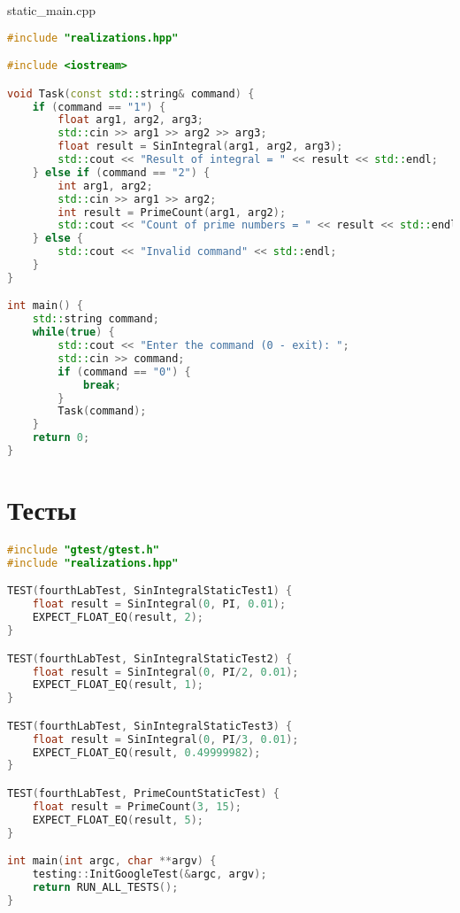 \documentclass[a4paper, 12pt]{article}
\begin{document}
static\_main.cpp
\begin{lstlisting}[language=C++]
#include "realizations.hpp"

#include <iostream>

void Task(const std::string& command) {
    if (command == "1") {
        float arg1, arg2, arg3;
        std::cin >> arg1 >> arg2 >> arg3;
        float result = SinIntegral(arg1, arg2, arg3);
        std::cout << "Result of integral = " << result << std::endl;
    } else if (command == "2") {
        int arg1, arg2;
        std::cin >> arg1 >> arg2;
        int result = PrimeCount(arg1, arg2);
        std::cout << "Count of prime numbers = " << result << std::endl;
    } else {
        std::cout << "Invalid command" << std::endl;
    }
}

int main() {
    std::string command;
    while(true) {
        std::cout << "Enter the command (0 - exit): ";
        std::cin >> command;
        if (command == "0") {
            break;
        }
        Task(command);
    }
    return 0;
}
\end{lstlisting}

\newpage
\section{Тесты}
\begin{lstlisting}[language=C++]
#include "gtest/gtest.h"
#include "realizations.hpp"

TEST(fourthLabTest, SinIntegralStaticTest1) {
    float result = SinIntegral(0, PI, 0.01);
    EXPECT_FLOAT_EQ(result, 2);
}

TEST(fourthLabTest, SinIntegralStaticTest2) {
    float result = SinIntegral(0, PI/2, 0.01);
    EXPECT_FLOAT_EQ(result, 1);
}

TEST(fourthLabTest, SinIntegralStaticTest3) {
    float result = SinIntegral(0, PI/3, 0.01);
    EXPECT_FLOAT_EQ(result, 0.49999982);
}

TEST(fourthLabTest, PrimeCountStaticTest) {
    float result = PrimeCount(3, 15);
    EXPECT_FLOAT_EQ(result, 5);
}

int main(int argc, char **argv) {
    testing::InitGoogleTest(&argc, argv);
    return RUN_ALL_TESTS();
}
\end{lstlisting}
\end{document}
